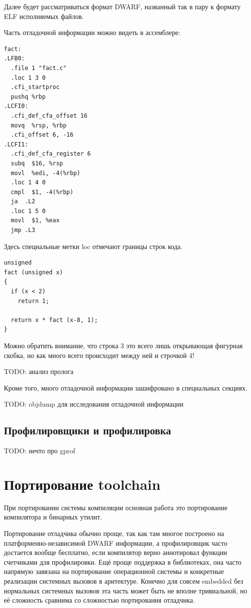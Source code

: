 \documentclass[a4paper,12pt,oneside]{article}
\begin{document}
Далее будет рассматриваться формат DWARF, названный так в пару к формату ELF исполняемых файлов.

Часть отладочной информации можно видеть в ассемблере:

\begin{verbatim}
fact:
.LFB0:
  .file 1 "fact.c"
  .loc 1 3 0
  .cfi_startproc
  pushq %rbp
.LCFI0:
  .cfi_def_cfa_offset 16
  movq  %rsp, %rbp
  .cfi_offset 6, -16
.LCFI1:
  .cfi_def_cfa_register 6
  subq  $16, %rsp
  movl  %edi, -4(%rbp)
  .loc 1 4 0
  cmpl  $1, -4(%rbp)
  ja  .L2
  .loc 1 5 0
  movl  $1, %eax
  jmp .L3
\end{verbatim}

Здесь специальные метки loc отмечают границы строк кода. 

\begin{lstlisting}
unsigned
fact (unsigned x)
{
  if (x < 2)
    return 1;

  return x * fact (x-8, 1);
}
\end{lstlisting}

Можно обратить внимание, что строка 3 это всего лишь открывающая фигурная скобка, но как много всего происходит между ней и строчкой 4!

TODO: анализ пролога

Кроме того, много отладочной информации зашифровано в  специальных секциях.

TODO: objdump для исследования отладочной информации

\subsection{Профилировщики и профилировка}\label{subsec:GPROF}

TODO: нечто про gprof

\section{Портирование toolchain}

При портировании системы компиляции основная работа это портирование компилятора и бинарных утилит. 

Портирование отладчика обычно проще, так как там многое построено на платформенно-независимой DWARF информации, а профилировщик часто достается вообще бесплатно, если компилятор верно аннотировал функции счетчиками для профилировки. Ещё проще поддержка в библиотеках, она часто напрямую завязана на портирование операционной системы и конкретные реализации системных вызовов в аритектуре. Конечно для совсем embedded без нормальных системных вызовов эта часть может быть не вполне тривиальной, но её сложность сравнима со сложностью портирования отладчика.
\end{document}
